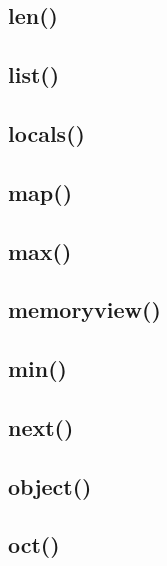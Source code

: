 \documentclass{article}
\begin{document}
\subsection{len()}
%

\subsection{list()}
%

\subsection{locals()}
%

\subsection{map()}
%

\subsection{max()}
%

\subsection{memoryview()}
%

\subsection{min()}
%

\subsection{next()}
%

\subsection{object()}
%

\subsection{oct()}
%
\end{document}
